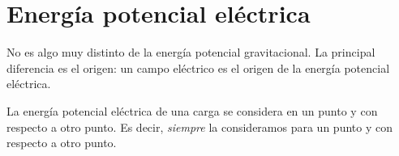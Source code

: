 \section{Energía potencial eléctrica}

No es algo muy distinto de la energía potencial gravitacional.
La principal diferencia es el origen:
un campo eléctrico es el origen de la energía potencial eléctrica.

La energía potencial eléctrica de una carga se considera en un punto
y con respecto a otro punto.
Es decir,
\textit{siempre} la consideramos para un punto y con respecto a otro punto.
